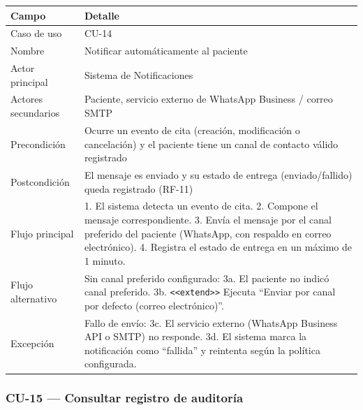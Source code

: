 \documentclass[11pt,a4paper]{article}
\begin{document}
	\begin{longtable}{p{} p{} }
		
		
		\toprule
		\textbf{Campo} &
		\textbf{Detalle}  \\
		\midrule
		\endhead
		
		Caso de uso & CU-14 \\
		Nombre & Notificar automáticamente al paciente \\
		Actor principal & Sistema de Notificaciones \\
		Actores secundarios & Paciente, servicio externo de WhatsApp Business / correo SMTP \\
		Precondición & Ocurre un evento de cita (creación, modificación o cancelación) y el paciente tiene un canal de contacto válido registrado \\
		Postcondición & El mensaje es enviado y su estado de entrega (enviado/fallido) queda registrado (RF-11) \\
		Flujo principal & 1. El sistema detecta un evento de cita. 2. Compone el mensaje correspondiente. 3. Envía el mensaje por el canal preferido del paciente (WhatsApp, con respaldo en correo electrónico). 4. Registra el estado de entrega en un máximo de 1 minuto. \\
		Flujo alternativo & Sin canal preferido configurado: 3a. El paciente no indicó canal preferido. 3b. \texttt{<<extend>>} Ejecuta ``Enviar por canal por defecto (correo electrónico)''. \\
		Excepción & Fallo de envío: 3c. El servicio externo (WhatsApp Business API o SMTP) no responde. 3d. El sistema marca la notificación como ``fallida'' y reintenta según la política configurada. \\
		\bottomrule
	\end{longtable}
	
	\subsubsection{CU-15 --- Consultar registro de auditoría}
	
\end{document}
